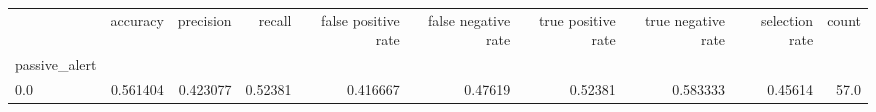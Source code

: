 \begin{tabular}{lrrrrrrrrr}
\toprule
{} &  accuracy &  precision &   recall &  false positive rate &  false negative rate &  true positive rate &  true negative rate &  selection rate &  count \\
passive\_alert &           &            &          &                      &                      &                     &                     &                 &        \\
\midrule
0.0           &  0.561404 &   0.423077 &  0.52381 &             0.416667 &              0.47619 &             0.52381 &            0.583333 &         0.45614 &   57.0 \\
\bottomrule
\end{tabular}
